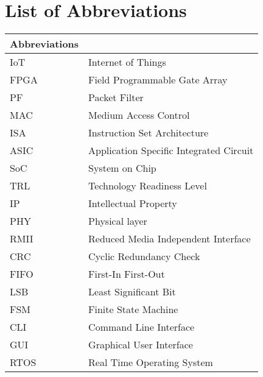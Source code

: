 


\clearpage
\pagestyle{headings}

\chapter[List of Abbreviations ]{List of Abbreviations}


\begin{center}
	\small
	\begin{longtable}{ll}
	\toprule
	Abbreviations & {} \\
	\bottomrule
	
	IoT				& Internet of Things \\
	FPGA				& Field Programmable Gate Array \\
	PF				& Packet Filter \\
	MAC				& Medium Access Control \\
	ISA				& Instruction Set Architecture \\
	ASIC				& Application Specific Integrated Circuit \\
	SoC				& System on Chip \\
	TRL				& Technology Readiness Level \\
	IP				& Intellectual Property \\
	PHY				& Physical layer \\
	RMII			& Reduced Media Independent Interface \\
	CRC			& Cyclic Redundancy Check \\
	FIFO			& First-In First-Out \\
	LSB				& Least Significant Bit \\
	FSM				& Finite State Machine \\
	CLI				& Command Line Interface \\
	GUI				& Graphical User Interface \\
	RTOS			& Real Time Operating System \\
	\hline 
	\end{longtable}
\end{center}

\clearpage

\tableofcontents
	\clearpage
\listoffigures
\listoftables


